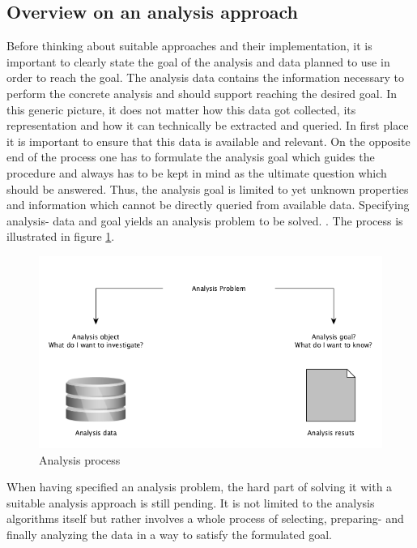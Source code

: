 \subsection{Overview on an analysis approach}
Before thinking about suitable approaches and their implementation, it is important to clearly state the goal of the analysis and data planned to use in order to reach the goal. The analysis data contains the information necessary to perform the concrete analysis and should support reaching the desired goal. In this generic picture, it does not matter how this data got collected, its representation and how it can technically be extracted and queried. In first place it is important to ensure that this data is available and relevant. On the opposite end of the process one has to formulate the analysis goal which guides the procedure and always has to be kept in mind as the ultimate question which should be answered. Thus, the analysis goal is limited to yet unknown properties and information which cannot be directly queried from available data. Specifying analysis- data and goal yields an analysis problem to be solved. \cite{neckel2015} \cite{knobloch2000data}. The process is illustrated in figure \ref{fig:analysisProcess}.

\begin{figure}
	\centering
	\includegraphics[width=1.0\textwidth]{img/analysis.png}
	\caption{Analysis process \cite{neckel2015}}
	\label{fig:analysisProcess}
\end{figure} 

When having specified an analysis problem, the hard part of solving it with a suitable analysis approach is still pending. It is not limited to the analysis algorithms itself but rather involves a whole process of selecting, preparing- and finally analyzing the data in a way to satisfy the formulated goal. 

